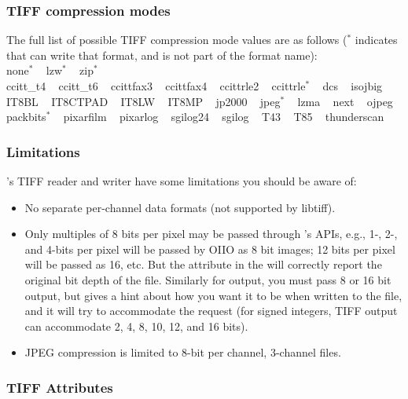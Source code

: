 \subsubsection*{TIFF compression modes}

\noindent The full list of possible TIFF compression mode values are as
follows ($ ^*$ indicates that \product can write that format, and is not
part of the format name): \\
    {\kw none}$ ^*$  ~
    {\kw lzw}$ ^*$  ~
    {\kw zip}$ ^*$  ~ \\
    {\kw ccitt_t4}  ~
    {\kw ccitt_t6}  ~
    {\kw ccittfax3}  ~
    {\kw ccittfax4}  ~
    {\kw ccittrle2}  ~
    {\kw ccittrle}$ ^*$  ~
    {\kw dcs}  ~
    {\kw isojbig}  ~
    {\kw IT8BL}  ~
    {\kw IT8CTPAD}  ~
    {\kw IT8LW}  ~
    {\kw IT8MP}  ~
    {\kw jp2000}  ~
    {\kw jpeg}$ ^*$  ~
    {\kw lzma}  ~
    {\kw next}  ~
    {\kw ojpeg}  ~
    {\kw packbits}$ ^*$  ~
    {\kw pixarfilm}  ~
    {\kw pixarlog}  ~
    {\kw sgilog24}  ~
    {\kw sgilog}  ~
    {\kw T43}  ~
    {\kw T85}  ~
    {\kw thunderscan}  ~

\subsubsection*{Limitations}

\product's TIFF reader and writer have some limitations you should be
aware of:
\begin{itemize}
\item No separate per-channel data formats (not supported by {\cf
  libtiff}).
\item Only multiples of 8 bits per pixel may be passed through
  \product's APIs, e.g., 1-, 2-, and 4-bits per pixel will be passed
  by OIIO as 8 bit images; 12 bits per pixel will be passed as 16,
  etc.  But the  attribute in the \ImageSpec
  will correctly report the original bit depth of the file. Similarly
  for output, you must pass 8 or 16 bit output, but 
  gives a hint about how you want it to be when written to the file, and
  it will try to accommodate the request (for signed integers,
  TIFF output can accommodate 2, 4, 8, 10, 12, and 16 bits).
\item JPEG compression is limited to 8-bit per channel, 3-channel files.
\end{itemize}


\newpage 
\subsubsection*{TIFF Attributes}

